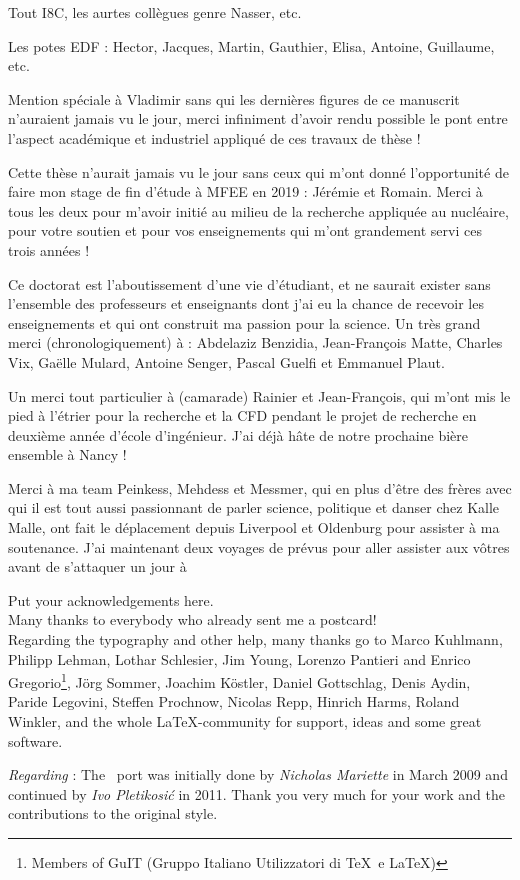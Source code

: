 Tout I8C, les aurtes collègues genre Nasser, etc.

Les potes EDF : Hector, Jacques, Martin, Gauthier, Elisa, Antoine, Guillaume, etc.



Mention spéciale à Vladimir sans qui les dernières figures de ce manuscrit n'auraient jamais vu le jour, merci infiniment d'avoir rendu possible le pont entre l'aspect académique et industriel appliqué de ces travaux de thèse !

Cette thèse n'aurait jamais vu le jour sans ceux qui m'ont donné l'opportunité de faire mon stage de fin d'étude à MFEE en 2019 : Jérémie et Romain. Merci à tous les deux pour m'avoir initié au milieu de la recherche appliquée au nucléaire, pour votre soutien et pour vos enseignements qui m'ont grandement servi ces trois années !


Ce doctorat est l'aboutissement d'une vie d'étudiant, et ne saurait exister sans l'ensemble des professeurs et enseignants dont j'ai eu la chance de recevoir les enseignements et qui ont construit ma passion pour la science. Un très grand merci (chronologiquement) à : Abdelaziz Benzidia, Jean-François Matte, Charles Vix, Gaëlle Mulard, Antoine Senger, Pascal Guelfi et Emmanuel Plaut. 

Un merci tout particulier à (camarade) Rainier et Jean-François, qui m'ont mis le pied à l'étrier pour la recherche et la CFD pendant le projet de recherche en deuxième année d'école d'ingénieur. J'ai déjà hâte de notre prochaine bière ensemble à Nancy !






Merci à ma team Peinkess, Mehdess et Messmer, qui en plus d'être des frères avec qui il est tout aussi passionnant de parler science, politique et danser chez Kalle Malle, ont fait le déplacement depuis Liverpool et Oldenburg pour assister à ma soutenance. J'ai maintenant deux voyages de prévus pour aller assister aux vôtres avant de s'attaquer un jour à 



\noindent Put your acknowledgements here.\\

\noindent Many thanks to everybody who already sent me a postcard!\\

\noindent Regarding the typography and other help, many thanks go to Marco Kuhlmann, Philipp Lehman, Lothar Schlesier, Jim Young, Lorenzo Pantieri and Enrico Gregorio\footnote{Members of GuIT (Gruppo Italiano Utilizzatori di \TeX\ e \LaTeX )}, J\"org Sommer, Joachim K\"ostler, Daniel Gottschlag, Denis Aydin, Paride Legovini, Steffen Prochnow, Nicolas Repp, Hinrich Harms, Roland Winkler, and the whole \LaTeX-community for support, ideas and some great software.

\bigskip

\noindent\emph{Regarding \mLyX}: The \mLyX\ port was initially done by
\emph{Nicholas Mariette} in March 2009 and continued by
\emph{Ivo Pletikosi\'c} in 2011. Thank you very much for your work and the contributions to the original style.

\endgroup